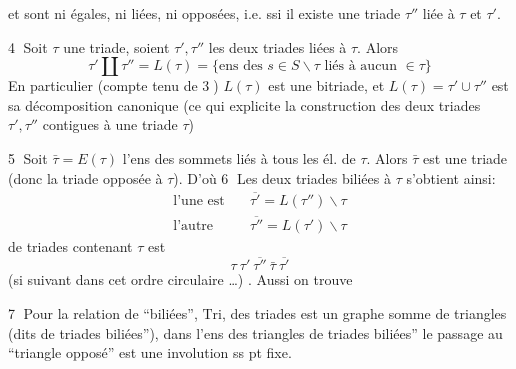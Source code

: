 et sont ni égales, ni liées, ni opposées, i.e. ssi  il existe une triade $\tau''$ liée à $\tau$ et $\tau'$.

\textcircled{\scriptsize 4} Soit $\tau$ une triade, soient $\tau',\tau''$ les deux triades liées à $\tau$. Alors
\[
\tau'\amalg\tau''=L(\tau)=\{\text{ens des }s\in S\smallsetminus\tau\text{ liés à aucun }\in\tau\}
\tag*{a)}
\]
 En particulier (compte tenu de \textcircled{\scriptsize 3}) $L(\tau)$ est une bitriade, et $L(\tau)=\tau'\cup\tau''$ est sa décomposition canonique
(ce qui explicite la construction des deux triades $\tau',\tau''$ contigues à une triade $\tau$)

\textcircled{\scriptsize 5} Soit $\bar\tau=E(\tau)$ l'ens des sommets liés à tous les él. de $\tau$. Alors $\bar\tau$ est une triade (donc la triade opposée à $\tau$).
D'où \textcircled{\scriptsize 6} Les deux triades biliées à $\tau$ s'obtient ainsi:
\[
\begin{aligned}
\text{l'une est}\quad&\overline{\tau'}=L(\tau'')\smallsetminus\tau\\
\text{l'autre}\quad&\overline{\tau''}=L(\tau')\smallsetminus\tau
\end{aligned}
\]
 de triades contenant $\tau$ est \deleted{\unsure{$\xi$}}
\[
\tau\ \tau'\ \overline{\tau''}\ \bar\tau\ \overline{\tau'}
\]
(si suivant dans cet ordre circulaire \ldots) . Aussi on trouve

\textcircled{\scriptsize 7} Pour la relation de ``biliées'',   $\mathrm{Tri}$,  des triades est un graphe somme de triangles (dits   de triades biliées''), dans l'ens des triangles de triades biliées''  le passage au ``triangle opposé'' est une involution ss pt fixe.

